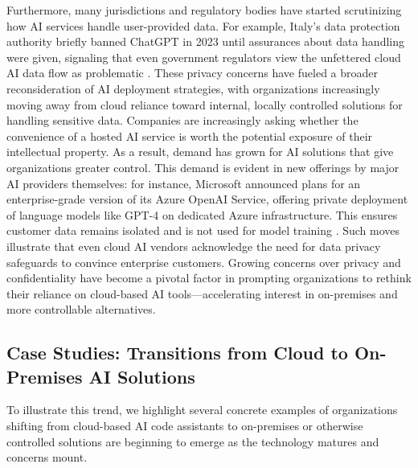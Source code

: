 Furthermore, many jurisdictions and regulatory bodies have started scrutinizing how \gls{AI} services handle user-provided data. For example, Italy’s data protection authority briefly banned ChatGPT in 2023 until assurances about data handling were given, signaling that even government regulators view the unfettered cloud \gls{AI} data flow as problematic \autocite{Reuters2023}. These privacy concerns have fueled a broader reconsideration of \gls{AI} deployment strategies, with organizations increasingly moving away from cloud reliance toward internal, locally controlled solutions for handling sensitive data. Companies are increasingly asking whether the convenience of a hosted \gls{AI} service is worth the potential exposure of their intellectual property. As a result, demand has grown for \gls{AI} solutions that give organizations greater control. This demand is evident in new offerings by major \gls{AI} providers themselves: for instance, Microsoft announced plans for an enterprise-grade version of its Azure OpenAI Service, offering private deployment of language models like GPT-4 on dedicated Azure infrastructure. This ensures customer data remains isolated and is not used for model training \autocite{MicrosoftAzureOpenAIPrivateDeployment}. Such moves illustrate that even cloud \gls{AI} vendors acknowledge the need for data privacy safeguards to convince enterprise customers. Growing concerns over privacy and confidentiality have become a pivotal factor in prompting organizations to rethink their reliance on cloud-based \gls{AI} tools—accelerating interest in on-premises and more controllable alternatives.

\subsection{Case Studies: Transitions from Cloud to On-Premises AI Solutions}
\label{sec:case-studies}
To illustrate this trend, we highlight several concrete examples of organizations shifting from cloud-based \gls{AI} code assistants to on-premises or otherwise controlled solutions are beginning to emerge as the technology matures and concerns mount.

